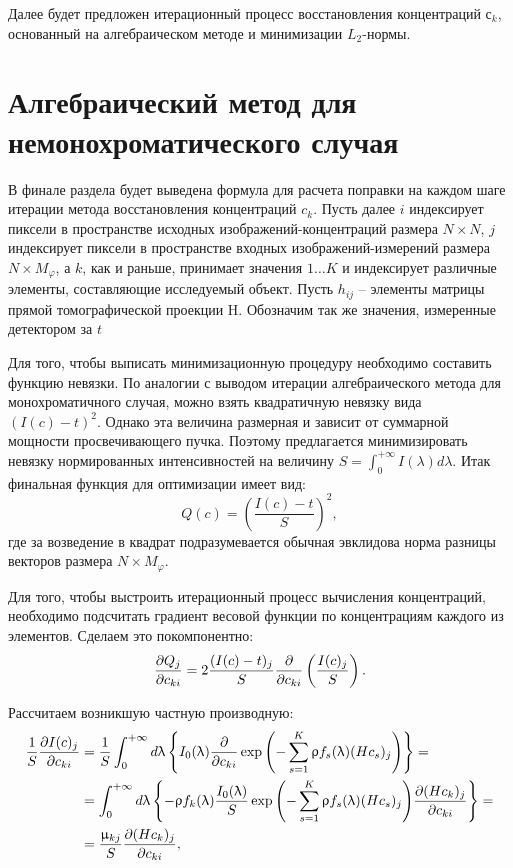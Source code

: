 Далее будет предложен итерационный процесс восстановления концентраций $с_k$, основанный на алгебраическом методе и минимизации $L_2$-нормы.

\section{Алгебраический метод для немонохроматического случая}

В финале раздела будет выведена формула для расчета поправки на каждом шаге итерации метода восстановления концентраций $c_k$.
Пусть далее $i$ индексирует пиксели в пространстве исходных изображений-концентраций размера $N \times N$, $j$ индексирует пиксели в пространстве входных изображений-измерений размера $N \times M_\varphi$, а $k$, как и раньше, принимает значения $1 \dots K$ и индексирует различные элементы, составляющие исследуемый объект.
Пусть $h_{ij}$ – элементы матрицы прямой томографической проекции H.
Обозначим так же значения, измеренные детектором за $t$

Для того, чтобы выписать минимизационную процедуру необходимо составить функцию невязки.
По аналогии с выводом итерации алгебраического метода для монохроматичного случая, можно взять квадратичную невязку вида $(I(c) - t)^2$.
Однако эта величина размерная и зависит от суммарной мощности просвечивающего пучка.
Поэтому предлагается минимизировать невязку нормированных интенсивностей на величину $ S = \int_0^{+\infty}{I(\lambda)d\lambda}$.
Итак финальная функция для оптимизации имеет вид:
\begin{equation}
\label{eq:white_cost_function}
Q(c) = \left(\frac{I(c) - t}{S}\right)^2,
\end{equation} 
где за возведение в квадрат подразумевается обычная эвклидова норма разницы векторов размера $N \times M_\varphi$.

Для того, чтобы выстроить итерационный процесс вычисления концентраций, необходимо подсчитать градиент весовой функции по концентрациям каждого из элементов. 
Сделаем это покомпонентно:
\begin{equation}
  \notag
  \frac {\partial Q_j} {\partial c_{ki}} = 
  2 \frac {(I(c) - t)_j} {S} 
  \frac {\partial } {\partial c_{ki}}
  \left( \frac {I(c)_j} {S} \right).
\end{equation}

Рассчитаем возникшую частную производную:
\begin{equation}
  \notag
  \begin{split}
  \frac 1 S
  \frac {\partial I(c)_j} {\partial c_{ki}} &= 
  \frac 1 S
  \int_0^{+\infty} {d\lambda \left\{
    I_0(\lambda) 
    \frac \partial {\partial c_{ki}}
    \exp{\left(
      -\sum_{s=1}^K {\rho f_s(\lambda) (H c_s)_j} 
      \right)}
    \right\}} = \\
  &= 
  \int_0^{+\infty} {d\lambda \left\{
    -\rho f_k(\lambda) 
    \frac {I_0(\lambda)} {S}
    \exp{\left(
      -\sum_{s=1}^K {\rho f_s(\lambda) (H c_s)_j} 
         \right)}
    \frac {\partial (H c_k)_j} {\partial c_{ki}}
    \right\}} = \\
  &= 
  \frac {\mu_{kj}} {S} \frac {\partial (H c_k)_j} {\partial c_{ki}},
  \end{split}
\end{equation}

